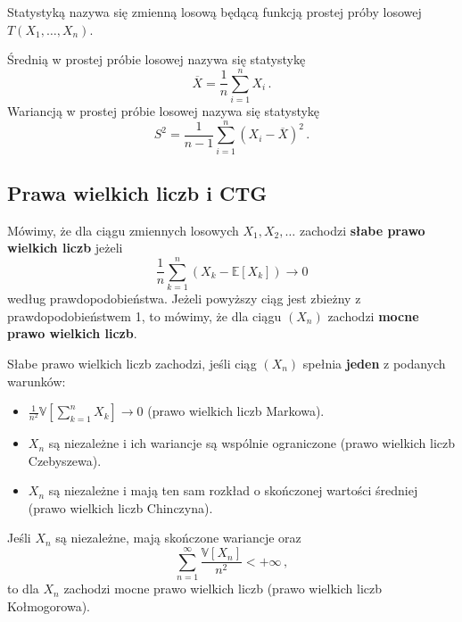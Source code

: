 \documentclass{myclass}
\numberwithin{equation}{section}
\begin{document}
\begin{definition}[Statystyki]
Statystyką nazywa się zmienną losową będącą funkcją prostej próby losowej \(T(X_1,\ldots,X_n)\).
\end{definition}
Średnią w prostej próbie losowej nazywa się statystykę
\begin{equation}
    \overline{X} = \frac{1}{n}\sum_{i=1}^n X_i\,.
\end{equation}
Wariancją w prostej próbie losowej nazywa się statystykę
\begin{equation}
    S^2 = \frac{1}{n - 1}\sum_{i=1}^n (X_i - \overline{X})^2\,.
\end{equation}


\subsection{Prawa wielkich liczb i CTG}

\begin{definition}
Mówimy, że dla ciągu zmiennych losowych \(X_1,X_2,\ldots\) zachodzi \textbf{słabe prawo wielkich
liczb} jeżeli
\begin{equation*}
    \frac{1}{n} \sum_{k=1}^n\left(X_k - \mathbb{E}[X_k]\right) \to 0
\end{equation*}
według prawdopodobieństwa. Jeżeli powyższy ciąg jest zbieżny z prawdopodobieństwem 1, to mówimy, że
dla ciągu \((X_n)\) zachodzi \textbf{mocne prawo wielkich liczb}.
\end{definition}

\begin{theorem}
Słabe prawo wielkich liczb zachodzi, jeśli ciąg \((X_n)\) spełnia \textbf{jeden} z podanych
warunków:
\begin{itemize}

    \item \(\frac{1}{n^2}\mathbb{V}\left[\sum_{k=1}^n X_k\right] \to 0\) (prawo wielkich liczb
    Markowa).

    \item \(X_n\) są niezależne i ich wariancje są wspólnie ograniczone (prawo wielkich liczb
    Czebyszewa).

    \item \(X_n\) są niezależne i mają ten sam rozkład o skończonej wartości średniej (prawo
    wielkich liczb Chinczyna).
    
\end{itemize}
\end{theorem}

\begin{theorem}
Jeśli \(X_n\) są niezależne, mają skończone wariancje oraz
\begin{equation*}
    \sum_{n=1}^\infty \frac{\mathbb{V}[X_n]}{n^2} < +\infty\,,
\end{equation*}
to dla \(X_n\) zachodzi mocne prawo wielkich liczb (prawo wielkich liczb Kołmogorowa).
\end{theorem}
\end{document}
